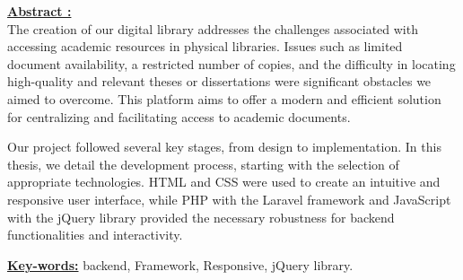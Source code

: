 \underline{\textbf{Abstract :}}\\
The creation of our digital library addresses the challenges associated with accessing academic resources in physical libraries. Issues such as limited document availability, a restricted number of copies, and the difficulty in locating high-quality and relevant theses or dissertations were significant obstacles we aimed to overcome. This platform aims to offer a modern and efficient solution for centralizing and facilitating access to academic documents.

Our project followed several key stages, from design to implementation. In this thesis, we detail the development process, starting with the selection of appropriate technologies. HTML and CSS were used to create an intuitive and responsive user interface, while PHP with the Laravel framework and JavaScript with the jQuery library provided the necessary robustness for backend functionalities and interactivity.\par
\begin{spacing}{1}
\underline{\textbf{Key-words:}} backend, Framework, Responsive, jQuery library.\\
\end{spacing}



    